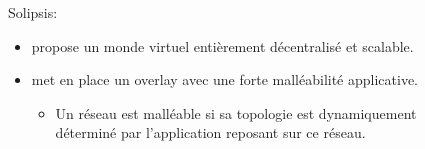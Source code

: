 \documentclass{beamer}
\begin{document}
\begin{frame}
\begin{columns}
\begin{column}{4cm}
\begin{figure}
        \label{Propa_Algo}
        \end{figure}
        \end{column}
        \end{columns}
  \end{frame}

  \begin{frame}
        \begin{columns}
          \begin{column}{6cm}
        Solipsis:\\
        \begin{itemize}
                \item propose un monde virtuel entièrement décentralisé et scalable.\\
                \item met en place un overlay avec une forte malléabilité applicative.\\
                \tiny{
                        \begin{itemize}
                                \item Un réseau est malléable si sa topologie est dynamiquement déterminé par l'application reposant sur ce réseau.\\
                        \end{itemize}
                }
        \end{itemize}
        \end{column}
        \begin{column}{4cm}
        \begin{figure}

\end{figure}
\end{column}
\end{columns}
\end{frame}
\end{document}
